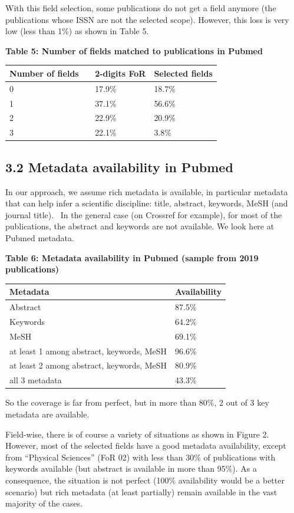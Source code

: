 \documentclass[
]{article}
\begin{document}
With this field selection, some publications do not get a field anymore
(the publications whose ISSN are not the selected scope). However, this
loss is very low (less than 1\%) as shown in Table 5.

\textbf{Table 5: Number of fields matched to publications in Pubmed}

\begin{longtable}[]{@{}lll@{}}
\toprule
Number of fields ~ & 2-digits FoR & Selected fields\tabularnewline
\midrule
\endhead
0 & 17.9\% & 18.7\%\tabularnewline
1 & 37.1\% & 56.6\%\tabularnewline
2 & 22.9\% & 20.9\%\tabularnewline
3 & 22.1\% & 3.8\%\tabularnewline
\bottomrule
\end{longtable}

\hypertarget{metadata-availability-in-pubmed}{%
\subsection{3.2 Metadata availability in
Pubmed}\label{metadata-availability-in-pubmed}}

In our approach, we assume rich metadata is available, in particular
metadata that can help infer a scientific discipline: title, abstract,
keywords, MeSH (and journal title). ~In the general case (on Crossref
for example), for most of the publications, the abstract and keywords
are not available. We look here at Pubmed metadata.

\textbf{Table 6: Metadata availability in Pubmed (sample from 2019
publications)}

\begin{longtable}[]{@{}ll@{}}
\toprule
Metadata & Availability\tabularnewline
\midrule
\endhead
Abstract ~ & 87.5\%\tabularnewline
Keywords & 64.2\%\tabularnewline
MeSH & 69.1\%\tabularnewline
at least 1 among abstract, keywords, MeSH & 96.6\%\tabularnewline
at least 2 among abstract, keywords, MeSH & 80.9\%\tabularnewline
all 3 metadata & 43.3\%\tabularnewline
\bottomrule
\end{longtable}

So the coverage is far from perfect, but in more than 80\%, 2 out of 3
key metadata are available.

Field-wise, there is of course a variety of situations as shown in
Figure 2. However, most of the selected fields have a good metadata
availability, except from ``Physical Sciences'' (FoR 02) with less than
30\% of publications with keywords available (but abstract is available
in more than 95\%). As a consequence, the situation is not perfect
(100\% availability would be a better scenario) but rich metadata (at
least partially) remain available in the vast majority of the cases.
\end{document}
